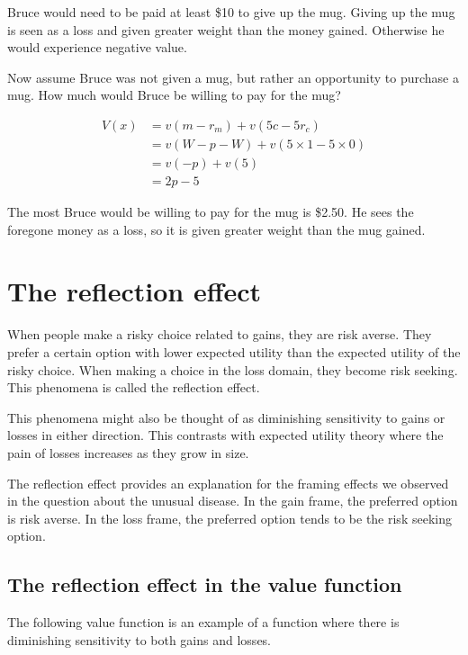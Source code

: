 \documentclass[
  letterpaper,
  DIV=11,
  numbers=noendperiod]{scrreprt}
\begin{document}
Bruce would need to be paid at least \$10 to give up the mug. Giving up
the mug is seen as a loss and given greater weight than the money
gained. Otherwise he would experience negative value.

Now assume Bruce was not given a mug, but rather an opportunity to
purchase a mug. How much would Bruce be willing to pay for the mug?

\begin{align*}
V(x)&=v(m-r_m)+v(5c-5r_c) \\
&=v(W-p-W)+v(5\times 1-5\times 0) \\
&=v(-p)+v(5) \\
&=2p-5
\end{align*}

The most Bruce would be willing to pay for the mug is \$2.50. He sees
the foregone money as a loss, so it is given greater weight than the mug
gained.

\hypertarget{the-reflection-effect}{%
\chapter{The reflection effect}\label{the-reflection-effect}}

When people make a risky choice related to gains, they are risk averse.
They prefer a certain option with lower expected utility than the
expected utility of the risky choice. When making a choice in the loss
domain, they become risk seeking. This phenomena is called the
reflection effect.

This phenomena might also be thought of as diminishing sensitivity to
gains or losses in either direction. This contrasts with expected
utility theory where the pain of losses increases as they grow in size.

The reflection effect provides an explanation for the framing effects we
observed in the question about the unusual disease. In the gain frame,
the preferred option is risk averse. In the loss frame, the preferred
option tends to be the risk seeking option.

\hypertarget{the-reflection-effect-in-the-value-function}{%
\section{The reflection effect in the value
function}\label{the-reflection-effect-in-the-value-function}}

The following value function is an example of a function where there is
diminishing sensitivity to both gains and losses.
\end{document}
